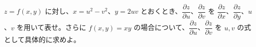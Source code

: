 
$z = f(x,y)$ に対し、$x = u^{2} - v^{2}$、$y = 2uv$ とおくとき、$\dfrac{\partial z}{\partial u}$、$\dfrac{\partial z}{\partial v}$ を $\dfrac{\partial z}{\partial x}$、$\dfrac{\partial z}{\partial y}$、$u$、$v$ を用いて表せ。さらに $f(x,y) = xy$ の場合について、$\dfrac{\partial z}{\partial u}$、$\dfrac{\partial z}{\partial v}$ を $u,v$ の式として具体的に求めよ。
